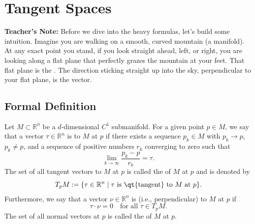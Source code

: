 \section{Tangent Spaces} %

\noindent
\textbf{Teacher's Note:} Before we dive into the heavy formulas, let's build some intuition. Imagine you are walking on a smooth, curved mountain (a manifold). At any exact point you stand, if you look straight ahead, left, or right, you are looking along a flat plane that perfectly grazes the mountain at your feet. That flat plane is the . The direction sticking straight up into the sky, perpendicular to your flat plane, is the  vector. 

\subsection{Formal Definition}

\setcounter{savedSection}{\value{section}}

\setcounter{section}{12}
\setcounter{theorem}{12} %

\begin{definition} %
Let $M \subset \mathbb{R}^n$ be a $d$-dimensional $C^1$ submanifold. %
For a given point $p \in M$, we say that a vector $\tau \in \mathbb{R}^n$ is  to $M$ at $p$ if there exists a sequence $p_k \in M$ with $p_k \to p$, $p_k \neq p$, and a sequence of positive numbers $r_k$ converging to zero such that %
\[
\lim_{k \to \infty} \frac{p_k - p}{r_k} = \tau. %
\]
The set of all tangent vectors to $M$ at $p$ is called the  of $M$ at $p$ and is denoted by %
\[
T_pM := \{ \tau \in \mathbb{R}^n \mid \tau \text{ is \qt{tangent} to } M \text{ at } p \}. %
\]
Furthermore, we say that a vector $\nu \in \mathbb{R}^n$ is  (i.e., perpendicular) to $M$ at $p$ if %
\[
\tau \cdot \nu = 0 \quad \text{for all } \tau \in T_pM. %
\]
The set of all normal vectors at $p$ is called the  of $M$ at $p$. %
\end{definition}

\setcounter{section}{\value{savedSection}}

